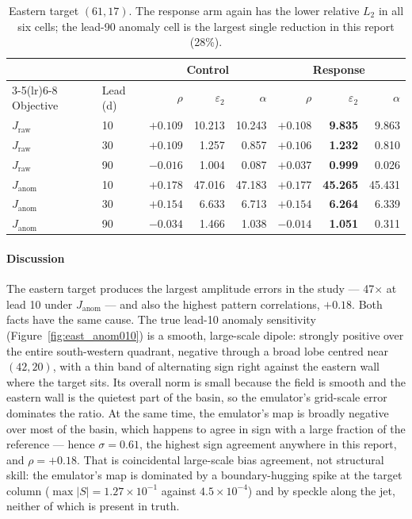 \documentclass[3p,12pt]{elsarticle}
\begin{document}
\begin{table}[H]
\centering
\small
\begin{tabular}{llrrrrrr}
\toprule
& & \multicolumn{3}{c}{Control} & \multicolumn{3}{c}{Response} \\
\cmidrule(lr){3-5}\cmidrule(lr){6-8}
Objective & Lead (d) & $\rho$ & $\varepsilon_2$ & $\alpha$ & $\rho$ & $\varepsilon_2$ & $\alpha$ \\
\midrule
$J_{\mathrm{raw}}$  & 10 & $+0.109$ & 10.213 & 10.243 & $+0.108$ & \textbf{9.835} & 9.863 \\
$J_{\mathrm{raw}}$  & 30 & $+0.109$ & 1.257 & 0.857 & $+0.106$ & \textbf{1.232} & 0.810 \\
$J_{\mathrm{raw}}$  & 90 & $-0.016$ & 1.004 & 0.087 & $+0.037$ & \textbf{0.999} & 0.026 \\
$J_{\mathrm{anom}}$ & 10 & $+0.178$ & 47.016 & 47.183 & $+0.177$ & \textbf{45.265} & 45.431 \\
$J_{\mathrm{anom}}$ & 30 & $+0.154$ & 6.633 & 6.713 & $+0.154$ & \textbf{6.264} & 6.339 \\
$J_{\mathrm{anom}}$ & 90 & $-0.034$ & 1.466 & 1.038 & $-0.014$ & \textbf{1.051} & 0.311 \\
\bottomrule
\end{tabular}
\caption{Eastern target $(61,17)$. The response arm again has the lower relative
$L_2$ in all six cells; the lead-90 anomaly cell is the largest single reduction
in this report (28\%).}
\label{tab:eastern}
\end{table}

\paragraph{Discussion} The eastern target produces the largest amplitude errors
in the study --- 47$\times$ at lead 10 under $J_{\mathrm{anom}}$ --- and also
the highest pattern correlations, $+0.18$. Both facts have the same cause. The
true lead-10 anomaly sensitivity (Figure~\ref{fig:east_anom010}) is a smooth,
large-scale dipole: strongly positive over the entire south-western quadrant,
negative through a broad lobe centred near $(42,20)$, with a thin band of
alternating sign right against the eastern wall where the target sits. Its
overall norm is small because the field is smooth and the eastern wall is the
quietest part of the basin, so the emulator's grid-scale error dominates the
ratio. At the same time, the emulator's map is broadly negative over most of the
basin, which happens to agree in sign with a large fraction of the reference ---
hence $\sigma=0.61$, the highest sign agreement anywhere in this report, and
$\rho=+0.18$. That is coincidental large-scale bias agreement, not structural
skill: the emulator's map is dominated by a boundary-hugging spike at the target
column ($\max|S|=1.27\times10^{-1}$ against $4.5\times10^{-4}$) and by speckle
along the jet, neither of which is present in truth.
\end{document}
